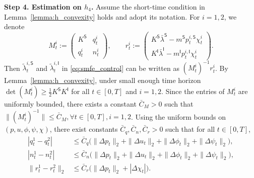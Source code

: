 \documentclass[letterpaper, 10 pt, conference]{ieeeconf}  %
\def\sS{\mathsf{S}}
\def\sI{\mathsf{I}}
\begin{document}
\textbf{Step 4. Estimation on $h_4$.}
Assume the short-time condition in Lemma~\ref{lemma:h_convexity} holds and adopt its notation. For $i=1,2$, we denote
\small
$$
M_t^i:=
\begin{pmatrix}
K^\sS & q_t^i\\
q_t^i & n_t^i
\end{pmatrix},
\qquad
r_t^i:=
\begin{pmatrix}
K^\sS\bar\lambda^\sS-m^\sS p_t^{i,\sS}\chi_t^i\\
K^\sI\bar\lambda^\sI-m^\sI p_t^{i,\sI}\chi_t^i
\end{pmatrix}.
$$\normalsize
Then $\tilde{\lambda}_t^{i,\sS}$ and $\tilde{\lambda}_t^{i,\sI}$ in \eqref{eq:smfe_control} can be written as $(M_t^i)^{-1}r_t^i$. By Lemma~\ref{lemma:h_convexity}, under small enough time horizon $\det(M_t^i)\geq \frac{1}{2}K^\sS K^\sI$ for all $t\in[0,T]$ and $i=1,2$. Since the entries of $M_t^i$ are uniformly bounded, there exists a constant $\bar C_M>0$ such that $\|(M_t^i)^{-1}\|\leq \bar{C}_M, \forall t\in[0,T], i=1,2$. Using the uniform bounds on $(p,u,\phi,\psi,\chi)$, there exist constants
$\bar C_q,\bar C_n,\bar C_r>0$ such that for all $t\in[0,T]$,
\begin{equation*}
    \begin{aligned}
        |q_t^1-q_t^2|
&\leq \bar C_q\big(\|\Delta p_t\|_2+\|\Delta u_t\|_2+\|\Delta\phi_t\|_2+\|\Delta\psi_t\|_2\big), \\ |n_t^1-n_t^2|
&\leq \bar C_n\big(\|\Delta p_t\|_2+\|\Delta u_t\|_2+\|\Delta\phi_t\|_2+\|\Delta\psi_t\|_2\big), \\
\|r_t^1-r_t^2\|_2
&\leq \bar C_r\big(\|\Delta p_t\|_2+|\Delta\chi_t|\big).
    \end{aligned}
\end{equation*}
\end{document}
